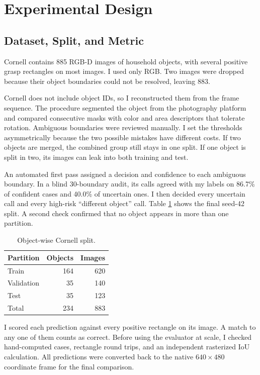 \documentclass[10pt,conference,compsoc]{IEEEtran}
\begin{document}
\section{Experimental Design}

\subsection{Dataset, Split, and Metric}

Cornell contains 885 RGB-D images of household objects, with several positive
grasp rectangles on most images. I used only RGB. Two images were dropped
because their object boundaries could not be resolved, leaving 883.

Cornell does not include object IDs, so I reconstructed them from the frame
sequence. The procedure segmented the object from the photography platform
and compared consecutive masks with color and area descriptors that tolerate
rotation. Ambiguous boundaries were reviewed manually. I set the thresholds
asymmetrically because the two possible mistakes have different costs. If two
objects are merged, the combined group still stays in one split. If one
object is split in two, its images can leak into both training and test.

An automated first pass assigned a decision and confidence to each ambiguous
boundary. In a blind 30-boundary audit, its calls agreed with my labels on
86.7\% of confident cases and 40.0\% of uncertain ones. I then decided every
uncertain call and every high-risk ``different object'' call. Table
\ref{tab:split} shows the final seed-42 split. A second check confirmed that
no object appears in more than one partition.

\begin{table}[t]
\caption{Object-wise Cornell split.}
\label{tab:split}
\centering
\begin{tabular}{lrr}
\toprule
Partition & Objects & Images \\
\midrule
Train & 164 & 620 \\
Validation & 35 & 140 \\
Test & 35 & 123 \\
\midrule
Total & 234 & 883 \\
\bottomrule
\end{tabular}
\end{table}

I scored each prediction against every positive rectangle on its image. A
match to any one of them counts as correct. Before using the evaluator at
scale, I checked hand-computed cases, rectangle round trips, and an independent
rasterized IoU calculation. All predictions were converted back to the native
$640\times480$ coordinate frame for the final comparison.
\end{document}
